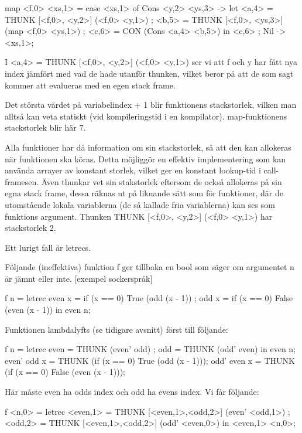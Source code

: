 \documentclass[../Core]{subfiles}
\begin{document}
\begin{codeEx}
map <f,0> <xs,1> = case <xs,1> of
    { Cons <y,2> <ys,3> -> let
        { <a,4> = THUNK [<f,0>, <y,2>]  (<f,0> <y,1>)
        ; <b,5> = THUNK [<f,0>, <ys,3>] (map <f,0> <ys,1>)
        ; <c,6> = CON (Cons <a,4> <b,5>)
        } in <c,6>
    ; Nil -> <xs,1>};
\end{codeEx}

I <a,4> = THUNK [<f,0>, <y,2>]  (<f,0> <y,1>) ser vi att f och y har fått nya index jämfört med
vad de hade utanför thunken, vilket beror på att de som sagt kommer att evalueras med en egen
stack frame.

Det största värdet på variabelindex + 1 blir funktionens stackstorlek, vilken man alltså
kan veta statiskt (vid kompileringstid i en kompilator). map-funktionens stackstorlek blir här 7.

Alla funktioner har då information om sin stackstorlek, så att den kan allokeras när funktionen ska köras.
Detta möjliggör en effektiv implementering som kan använda arrayer av konstant storlek, 
vilket ger en konstant lookup-tid i call-framesen.
Även thunkar vet sin stakstorlek eftersom de också allokeras på sin egna stack frame, dessa
räknas ut på liknande sätt som för funktioner, där de utomstående lokala variablerna (de så kallade fria 
variablerna) kan ses som funktions argument.
Thunken THUNK [<f,0>, <y,2>]  (<f,0> <y,1>) har stackstorlek 2.

Ett lurigt fall är letrecs.

Följande (ineffektiva) funktion f ger tillbaka en bool som säger om argumentet n är jämnt eller inte.
[exempel {sockerspråk}]
\begin{codeEx}
f n = letrec 
    { even x = if (x == 0) True  (odd  (x - 1))
    ; odd  x = if (x == 0) False (even (x - 1))
    } in even n;
\end{codeEx}

Funktionen lambdalyfts (se tidigare avsnitt) först till följande:

\begin{codeEx}
f n = letrec 
    { even = THUNK (even' odd)
    ; odd  = THUNK (odd' even)
    } in even n;
even' odd x = THUNK (if (x == 0) True  (odd  (x - 1)));
odd' even x = THUNK (if (x == 0) False (even (x - 1)));
\end{codeEx}

Här måste even ha odds index och odd ha evens index. Vi får följande:

\begin{codeEx}
f <n,0> = letrec 
    { <even,1> = THUNK [<even,1>,<odd,2>] (even' <odd,1>)
    ; <odd,2>  = THUNK [<even,1>,<odd,2>] (odd' <even,0>)
    } in <even,1> <n,0>;
\end{codeEx}
\end{document}
